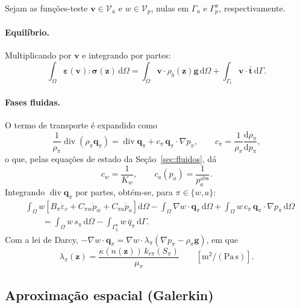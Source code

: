 \documentclass[11pt,a4paper]{article}
\numberwithin{equation}{section}
\newcommand{\Div}{\operatorname{div}}
\newcommand{\dd}{\mathrm{d}}
\begin{document}
Sejam as funções-teste $\mathbf v\in\mathcal V_u$ e $w\in\mathcal V_p$,
nulas em $\Gamma_u$ e $\Gamma_p^{\pi}$, respectivamente.

\paragraph{Equilíbrio.} Multiplicando por $\mathbf v$ e integrando por partes:
\begin{equation}
\boxed{\int_\Omega\boldsymbol\varepsilon(\mathbf v):\boldsymbol\sigma(\mathbf z)\,\dd\Omega
=\int_\Omega\mathbf v\cdot\rho_b(\mathbf z)\mathbf g\,\dd\Omega
+\int_{\Gamma_t}\mathbf v\cdot\bar{\mathbf t}\,\dd\Gamma.}
\end{equation}

\paragraph{Fases fluidas.} O termo de transporte é expandido como
\begin{equation}
\frac{1}{\rho_\pi}\Div(\rho_\pi\mathbf q_\pi)
=\Div\mathbf q_\pi+c_\pi\,\mathbf q_\pi\cdot\nabla p_\pi,
\qquad
c_\pi=\frac{1}{\rho_\pi}\frac{\dd\rho_\pi}{\dd p_\pi},
\end{equation}
o que, pelas equações de estado da Seção~\ref{sec:fluidos}, dá
\begin{equation}
c_w=\frac{1}{K_w},\qquad c_a(p_a)=\frac{1}{p_a^{\mathrm{abs}}}.
\end{equation}
Integrando $\Div\mathbf q_\pi$ por partes, obtém-se, para $\pi\in\{w,a\}$:
\begin{equation}
\boxed{\begin{aligned}
&\int_\Omega w\left[B_\pi\dot\varepsilon_v+C_{\pi w}\dot p_w+C_{\pi a}\dot p_a\right]\dd\Omega
-\int_\Omega\nabla w\cdot\mathbf q_\pi\,\dd\Omega
+\int_\Omega w\,c_\pi\,\mathbf q_\pi\cdot\nabla p_\pi\,\dd\Omega\\
&\qquad=\int_\Omega w\,s_\pi\,\dd\Omega-\int_{\Gamma_q^{\pi}}w\,\bar q_\pi\,\dd\Gamma .
\end{aligned}}
\end{equation}
Com a lei de Darcy, $-\nabla w\cdot\mathbf q_\pi
=\nabla w\cdot\lambda_\pi(\nabla p_\pi-\rho_\pi\mathbf g)$, em que
\begin{equation}
\boxed{\lambda_\pi(\mathbf z)=\frac{\kappa(n(\mathbf z))\,k_{r\pi}(S_\pi)}{\mu_\pi}
\qquad[\mathrm{m^2/(Pa\,s)}].}
\end{equation}

\subsection{Aproximação espacial (Galerkin)}
\end{document}
